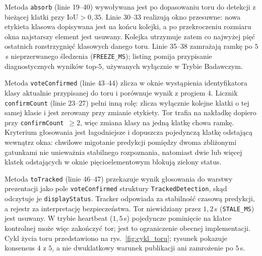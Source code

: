 Metoda \texttt{absorb} (linie 19--40) wywoływana jest po dopasowaniu toru do detekcji z bieżącej klatki przy $\mathrm{IoU}>0{,}35$. Linie 30--33 realizują okno przesuwne: nowa etykieta klasowa dopisywana jest na końcu kolejki, a po przekroczeniu rozmiaru okna najstarszy element jest usuwany. Kolejka utrzymuje zatem co najwyżej pięć ostatnich rozstrzygnięć klasowych danego toru. Linie 35--38 zamrażają ramkę po $5$\,s nieprzerwanego śledzenia (\texttt{FREEZE\_MS}); listing pomija przypisanie diagnostycznych wyników top-$5$, używanych wyłącznie w Trybie Badawczym.

Metoda \texttt{voteConfirmed} (linie 43--44) zlicza w oknie wystąpienia identyfikatora klasy aktualnie przypisanej do toru i porównuje wynik z progiem $4$. Licznik \texttt{confirmCount} (linie 23--27) pełni inną rolę: zlicza wyłącznie kolejne klatki o tej samej klasie i jest zerowany przy zmianie etykiety. Tor trafia na nakładkę dopiero przy \texttt{confirmCount}~$\ge 2$, więc zmiana klasy na jedną klatkę chowa ramkę. Kryterium głosowania jest łagodniejsze i dopuszcza pojedynczą klatkę odstającą wewnątrz okna: chwilowe migotanie predykcji pomiędzy dwoma zbliżonymi gatunkami nie unieważnia stabilnego rozpoznania, natomiast dwie lub więcej klatek odstających w oknie pięcioelementowym blokują zielony status.

Metoda \texttt{toTracked} (linie 46--47) przekazuje wynik głosowania do warstwy prezentacji jako pole \texttt{voteConfirmed} struktury \texttt{TrackedDetection}, skąd odczytuje je \texttt{displayStatus}. Tracker odpowiada za stabilność czasową predykcji, a rejestr za interpretację bezpieczeństwa. Tor niewidziany przez $1{,}2$\,s (\texttt{STALE\_MS}) jest usuwany. W trybie heartbeat ($1{,}5$\,s) pojedyncze pominięcie na klatce kontrolnej może więc zakończyć tor; jest to ograniczenie obecnej implementacji. Cykl życia toru przedstawiono na rys.~\ref{fig:cykl_toru}; rysunek pokazuje konsensus $4$ z $5$, a nie dwuklatkowy warunek publikacji ani zamrożenie po $5$\,s.

